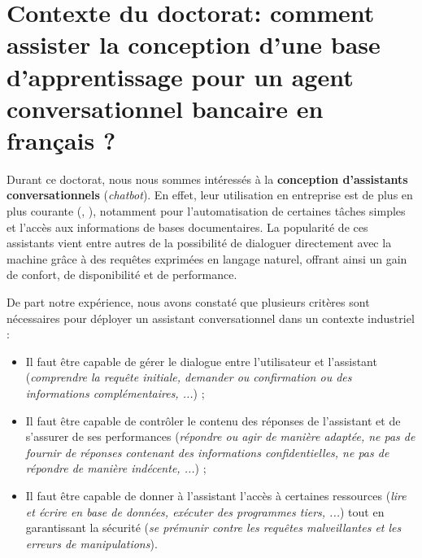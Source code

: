 \section{Contexte du doctorat: comment assister la conception d'une base d'apprentissage pour un agent conversationnel bancaire en français ?}
\label{section:2.4-CONTEXTE-DOCTORAT}

	Durant ce doctorat, nous nous sommes intéressés à la \textbf{conception d'assistants conversationnels} (\textit{chatbot}).
	En effet, leur utilisation en entreprise est de plus en plus courante (\cite{goasduff:2019:chatbots-will-appeal}, \cite{costello-lodolce:2022:gartner-predicts-chatbots}), notamment pour l'automatisation de certaines tâches simples et l'accès aux informations de bases documentaires.
	La popularité de ces assistants vient entre autres de la possibilité de dialoguer directement avec la machine grâce à des requêtes exprimées en langage naturel, offrant ainsi un gain de confort, de disponibilité et de performance.
	
	De part notre expérience, nous avons constaté que plusieurs critères sont nécessaires pour déployer un assistant conversationnel dans un contexte industriel :
	\begin{itemize}
		\item Il faut être capable de gérer le dialogue entre l'utilisateur et l'assistant (\textit{comprendre la requête initiale, demander ou confirmation ou des informations complémentaires, ...}) ;
		\item Il faut être capable de contrôler le contenu des réponses de l'assistant et de s'assurer de ses performances (\textit{répondre ou agir de manière adaptée, ne pas de fournir de réponses contenant des informations confidentielles, ne pas de répondre de manière indécente, ...}) ;
		\item Il faut être capable de donner à l'assistant l'accès à certaines ressources (\textit{lire et écrire en base de données, exécuter des programmes tiers, ...}) tout en garantissant la sécurité (\textit{se prémunir contre les requêtes malveillantes et les erreurs de manipulations}).
	\end{itemize}
	
